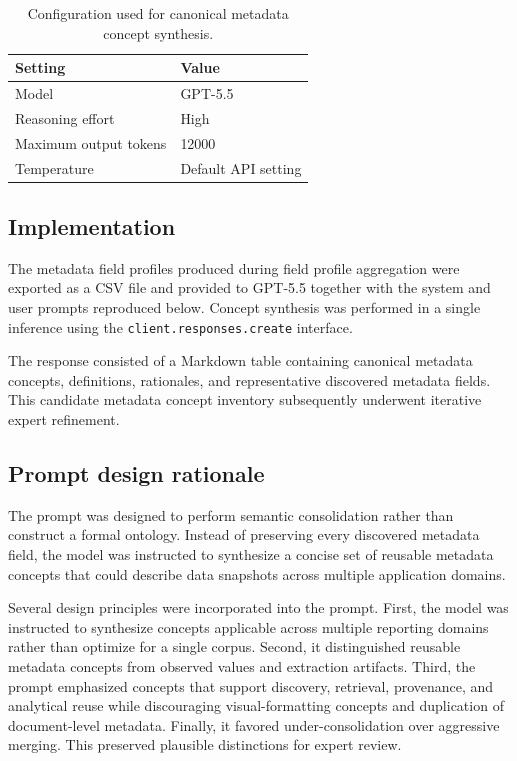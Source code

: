 \documentclass{article}
\begin{document}
\begin{table}[!ht]
    \centering
    \caption{Configuration used for canonical metadata concept synthesis.}
    \label{tab:ontology_induction_configuration}
    \begin{tabular}{ll}
    \toprule
    \textbf{Setting} & \textbf{Value} \\
    \midrule
    Model & GPT-5.5 \\
    Reasoning effort & High \\
    Maximum output tokens & 12000 \\
    Temperature & Default API setting \\
    \bottomrule
    \end{tabular}
\end{table}

\subsection{Implementation}

The metadata field profiles produced during field profile aggregation were exported as a CSV file and provided to GPT-5.5 together with the system and user prompts reproduced below. Concept synthesis was performed in a single inference using the \texttt{client.responses.create} interface.

The response consisted of a Markdown table containing canonical metadata concepts, definitions, rationales, and representative discovered metadata fields. This candidate metadata concept inventory subsequently underwent iterative expert refinement.

\subsection{Prompt design rationale}

The prompt was designed to perform semantic consolidation rather than construct a formal ontology. Instead of preserving every discovered metadata field, the model was instructed to synthesize a concise set of reusable metadata concepts that could describe data snapshots across multiple application domains.

Several design principles were incorporated into the prompt. First, the model was instructed to synthesize concepts applicable across multiple reporting domains rather than optimize for a single corpus. Second, it distinguished reusable metadata concepts from observed values and extraction artifacts. Third, the prompt emphasized concepts that support discovery, retrieval, provenance, and analytical reuse while discouraging visual-formatting concepts and duplication of document-level metadata. Finally, it favored under-consolidation over aggressive merging. This preserved plausible distinctions for expert review.
\end{document}
